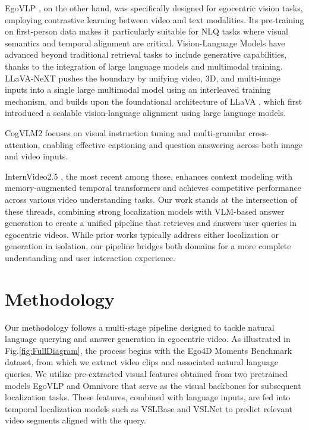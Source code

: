 \documentclass[10pt,twocolumn,letterpaper]{article}
\begin{document}
EgoVLP \cite{6_Egocentric_Video_Language_Pretraining}, on the other hand, was specifically designed for egocentric vision tasks, employing contrastive learning between video and text modalities. Its pre-training on first-person data makes it particularly suitable for NLQ tasks where visual semantics and temporal alignment are critical.
Vision-Language Models have advanced beyond traditional retrieval tasks to include generative capabilities, thanks to the integration of large language models and multimodal training. LLaVA-NeXT \cite{12_Liu2024LLaVANeXT_Tackling_Multi-image_Video_and_3D_in_Large_Multimodal_Models} pushes the boundary by unifying video, 3D, and multi-image inputs into a single large multimodal model using an interleaved training mechanism, and builds upon the foundational architecture of LLaVA \cite{14_Liu2023LLaVA_Large_Language_and_Vision_Assistant}, which first introduced a scalable vision-language alignment using large language models.
	
	
CogVLM2 \cite{11_Liu2024CogVLM2_Visual_Language_Models_for_Image_and_Video_Understanding} focuses on visual instruction tuning and multi-granular cross-attention, enabling effective captioning and question answering across both image and video inputs.
	
	
InternVideo2.5 \cite{13_Wang2024InternVideo_InternVideo2.5_Empowering_Video_MLLMs_with_Long_and_Rich_Context_Modeling}, the most recent among these, enhances context modeling with memory-augmented temporal transformers and achieves competitive performance across various video understanding tasks.
Our work stands at the intersection of these threads, combining strong localization models with VLM-based answer generation to create a unified pipeline that retrieves and answers user queries in egocentric videos. While prior works typically address either localization or generation in isolation, our pipeline bridges both domains for a more complete understanding and user interaction experience.
	

\section{Methodology}
	
Our methodology follows a multi-stage pipeline designed to tackle natural language querying and answer generation in egocentric video. As illustrated in Fig.\ref{fig:FullDiagram}, the process begins with the Ego4D Moments Benchmark dataset, from which we extract video clips and associated natural language queries. We utilize pre-extracted visual features obtained from two pretrained models EgoVLP and Omnivore that serve as the visual backbones for subsequent localization tasks. These features, combined with language inputs, are fed into temporal localization models such as VSLBase and VSLNet to predict relevant video segments aligned with the query.
\end{document}

